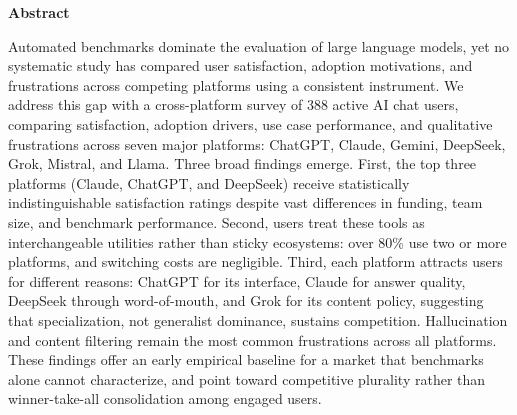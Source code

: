 \documentclass[10pt,twocolumn]{article}
\renewenvironment{abstract}{\noindent\textbf{Abstract}\par}{\par\vspace{6pt}}
\begin{document}

\begin{abstract}
Automated benchmarks dominate the evaluation of large language models, yet no systematic study has compared user satisfaction, adoption motivations, and frustrations across competing platforms using a consistent instrument. We address this gap with a cross-platform survey of 388 active AI chat users, comparing satisfaction, adoption drivers, use case performance, and qualitative frustrations across seven major platforms: ChatGPT, Claude, Gemini, DeepSeek, Grok, Mistral, and Llama. Three broad findings emerge. First, the top three platforms (Claude, ChatGPT, and DeepSeek) receive statistically indistinguishable satisfaction ratings despite vast differences in funding, team size, and benchmark performance. Second, users treat these tools as interchangeable utilities rather than sticky ecosystems: over 80\% use two or more platforms, and switching costs are negligible. Third, each platform attracts users for different reasons: ChatGPT for its interface, Claude for answer quality, DeepSeek through word-of-mouth, and Grok for its content policy, suggesting that specialization, not generalist dominance, sustains competition. Hallucination and content filtering remain the most common frustrations across all platforms. These findings offer an early empirical baseline for a market that benchmarks alone cannot characterize, and point toward competitive plurality rather than winner-take-all consolidation among engaged users.
\end{abstract}
\end{document}
